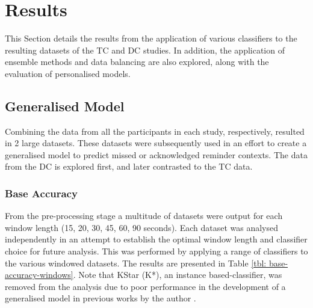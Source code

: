 \section{Results} \label{section: taut-results}
This Section details the results from the application of various classifiers to the resulting datasets of the TC and DC studies. In addition, the application of ensemble methods and data balancing are also explored, along with the evaluation of personalised models.

\subsection{Generalised Model}
Combining the data from all the participants in each study, respectively, resulted in 2 large datasets. These datasets were subsequently used in an effort to create a generalised model to predict missed or acknowledged reminder contexts. The data from the DC is explored first, and later contrasted to the TC data.

\subsubsection{Base Accuracy}
From the pre-processing stage a multitude of datasets were output for each window length (15, 20, 30, 45, 60, 90 seconds). Each dataset was analysed independently in an attempt to establish the optimal window length and classifier choice for future analysis. This was performed by applying a range of classifiers to the various windowed datasets. The results are presented in Table \ref{tbl: base-accuracy-windows}. Note that KStar (K*), an instance based-classifier, was removed from the analysis due to poor performance in the development of a generalised model in previous works by the author \cite{Hartin2014-WAGER}.

